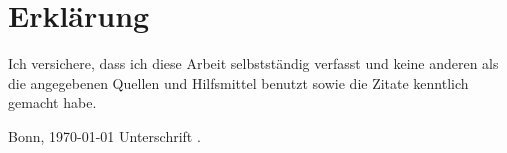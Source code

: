 
\chapter*{Erklärung}

Ich versichere, dass ich diese Arbeit selbstständig verfasst und keine anderen
als die angegebenen Quellen und Hilfsmittel benutzt sowie die Zitate kenntlich
gemacht habe.

\vspace{10ex}

Bonn, \today \hspace{3em} Unterschrift \hrulefill.
